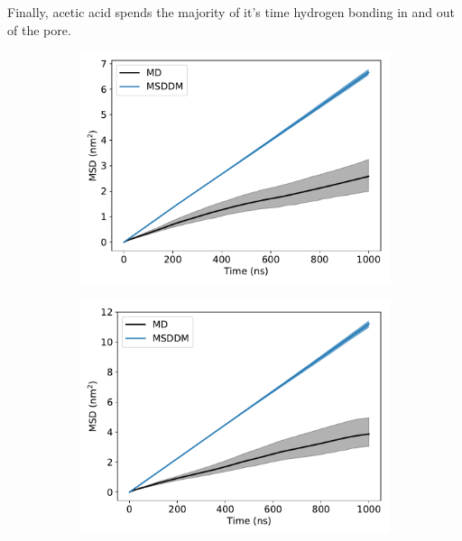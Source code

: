 \documentclass{article}
\begin{document}
  Finally, acetic acid spends the majority of it's time hydrogen bonding in and out
  of the pore.
  
%  
  
  
  \begin{figure}
  \centering
  \begin{subfigure}{0.45\textwidth}
  \includegraphics[width=\textwidth]{URE_msddm.pdf}
  \caption{}\label{fig:URE_msddm}
  \end{subfigure}
  \begin{subfigure}{0.45\textwidth}
  \includegraphics[width=\textwidth]{GCL_msddm.pdf}

\end{subfigure}
\end{figure}
\end{document}
